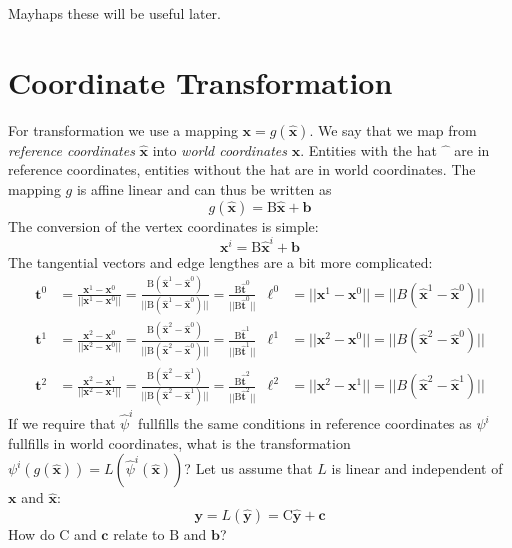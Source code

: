 \documentclass{scrartcl}
\begin{document}
Mayhaps these will be useful later.

\section{Coordinate Transformation}

For transformation we use a mapping $\mathbf x=g(\mathbf{\hat x})$.  We say
that we map from {\em reference coordinates} $\mathbf{\hat x}$ into {\em world
  coordinates} $\mathbf x$.  Entities with the hat $\hat{\phantom x}$ are in
reference coordinates, entities without the hat are in world coordinates.  The
mapping $g$ is affine linear and can thus be written as
\begin{equation}
  g(\mathbf{\hat x})=\mathrm B\mathbf{\hat x}+\mathbf b
\end{equation}
The conversion of the vertex coordinates is simple:
\begin{equation}
  \mathbf x^i=\mathrm B\mathbf{\hat x}^i+\mathbf b
\end{equation}
The tangential vectors and edge lengthes are a bit more complicated:
\begin{subequations}
  \begin{align}
    \mathbf t^0&
      =\frac{\mathbf x^1-\mathbf x^0}{||\mathbf x^1-\mathbf x^0||}
      =\frac{\mathrm B(\mathbf{\hat x}^1-\mathbf{\hat x}^0)}
            {||\mathrm B(\mathbf{\hat x}^1-\mathbf{\hat x}^0)||}
      =\frac{\mathrm B\mathbf{\hat t}^0}{||\mathrm B\mathbf{\hat t}^0||}
    &  \ell^0&=||\mathbf x^1-\mathbf x^0||
              =||B(\mathbf{\hat x}^1-\mathbf{\hat x}^0)||               \\
    \mathbf t^1&
      =\frac{\mathbf x^2-\mathbf x^0}{||\mathbf x^2-\mathbf x^0||}
      =\frac{\mathrm B(\mathbf{\hat x}^2-\mathbf{\hat x}^0)}
            {||\mathrm B(\mathbf{\hat x}^2-\mathbf{\hat x}^0)||}
      =\frac{\mathrm B\mathbf{\hat t}^1}{||\mathrm B\mathbf{\hat t}^1||}
    &  \ell^1&=||\mathbf x^2-\mathbf x^0||
              =||B(\mathbf{\hat x}^2-\mathbf{\hat x}^0)||               \\
    \mathbf t^2&
      =\frac{\mathbf x^2-\mathbf x^1}{||\mathbf x^2-\mathbf x^1||}
      =\frac{\mathrm B(\mathbf{\hat x}^2-\mathbf{\hat x}^1)}
            {||\mathrm B(\mathbf{\hat x}^2-\mathbf{\hat x}^1)||}
      =\frac{\mathrm B\mathbf{\hat t}^2}{||\mathrm B\mathbf{\hat t}^2||}
    &  \ell^2&=||\mathbf x^2-\mathbf x^1||
              =||B(\mathbf{\hat x}^2-\mathbf{\hat x}^1)||
  \end{align}
\end{subequations}
If we require that $\hat\psi^i$ fullfills the same conditions in reference
coordinates as $\psi^i$ fullfills in world coordinates, what is the
transformation $\psi^i(g(\mathbf{\hat x}))=L(\hat\psi^i(\mathbf{\hat x}))$?
Let us assume that $L$ is linear and independent of $\mathbf x$ and
$\mathbf{\hat x}$:
\begin{equation}
  \mathbf y=L(\mathbf{\hat y})=\mathrm C\mathbf{\hat y}+\mathbf c
\end{equation}
How do $\mathrm C$ and $\mathbf c$ relate to $\mathrm B$ and $\mathbf b$?  
\end{document}
